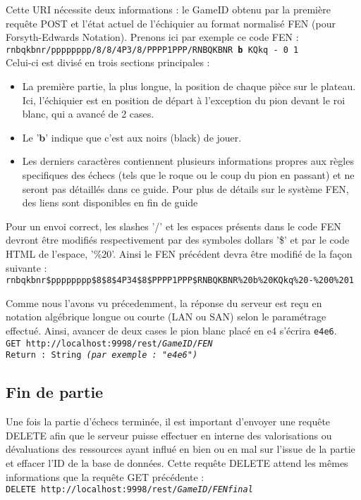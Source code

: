 \documentclass[a4paper,11pt]{article}
\begin{document}
Cette URI nécessite deux informations : le GameID obtenu par la première requête POST et l'état actuel de l'échiquier au format normalisé FEN (pour Forsyth-Edwards Notation). Prenons ici par exemple ce code FEN : 
\\{\tt rnbqkbnr/pppppppp/8/8/4P3/8/PPPP1PPP/RNBQKBNR {\bf b} KQkq - 0 1}\\
Celui-ci est divisé en trois sections principales :
\begin{itemize}
   \item La première partie, la plus longue, la position de chaque pièce sur le plateau. Ici, l'échiquier est en position de départ à l'exception du pion devant le roi blanc, qui a avancé de 2 cases.
   \item Le '{\bf b}' indique que c'est aux noirs (black) de jouer.
   \item Les derniers caractères contiennent plusieurs informations propres aux règles specifiques des échecs (tels que le roque ou le coup du pion en passant) et ne seront pas détaillés dans ce guide. Pour plus de détails sur le système FEN, des liens sont disponibles en fin de guide 
\end{itemize}
Pour un envoi correct, les slashes '/' et les espaces présents dans le code FEN devront être modifiés respectivement par des symboles dollars '\$' et par le code HTML de l'espace, '\%20'.
Ainsi le FEN précédent devra être modifié de la façon suivante :
\\{\tt rnbqkbnr\$pppppppp\$8\$8\$4P34\$8\$PPPP1PPP\$RNBQKBNR\%20b\%20KQkq\%20-\%200\%201}
        
Comme nous l'avons vu précedemment, la réponse du serveur est reçu en notation algébrique longue ou courte (LAN ou SAN) selon le paramétrage effectué.
Ainsi, avancer de deux cases le pion blanc placé en e4 s'écrira {\tt e4e6}.
\\{\tt GET http://localhost:9998/rest/{\em GameID}/{\em FEN}\\
Return : String {\em (par exemple : "e4e6")} }\\
        


\subsection{Fin de partie}
Une fois la partie d'échecs terminée, il est important d'envoyer une requête DELETE afin que le serveur puisse effectuer en interne des valorisations ou dévaluations des ressources ayant influé en bien ou en mal sur l'issue de la partie et effacer l'ID de la base de données.
Cette requête DELETE attend les mêmes informations que la requête GET précédente : 
\\{\tt DELETE http://localhost:9998/rest/{\em GameID}/{\em FENfinal}}
\end{document}
